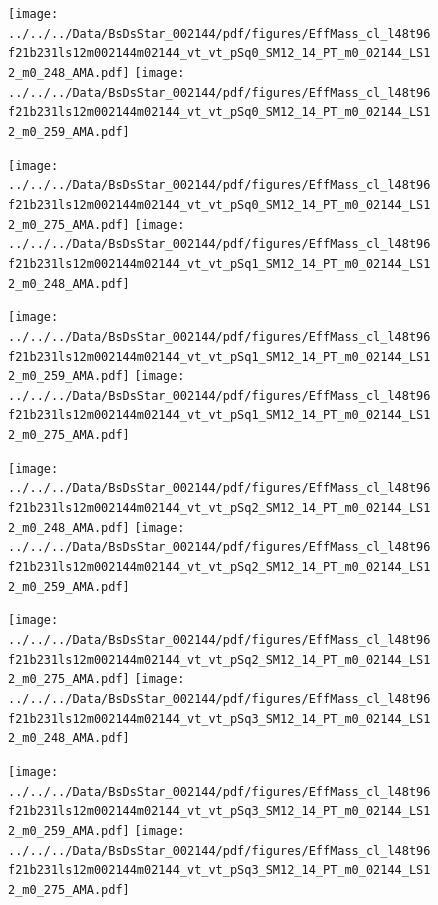 \documentclass[a4paper,10pt]{article}
\begin{document}
\begin{figure}[p]
 \texttt{[image: ../../../Data/BsDsStar\_002144/pdf/figures/EffMass\_cl\_l48t96f21b231ls12m002144m02144\_vt\_vt\_pSq0\_SM12\_14\_PT\_m0\_02144\_LS12\_m0\_248\_AMA.pdf]} 
 \texttt{[image: ../../../Data/BsDsStar\_002144/pdf/figures/EffMass\_cl\_l48t96f21b231ls12m002144m02144\_vt\_vt\_pSq0\_SM12\_14\_PT\_m0\_02144\_LS12\_m0\_259\_AMA.pdf]} 
 \end{figure}
\begin{figure}[p]
 \texttt{[image: ../../../Data/BsDsStar\_002144/pdf/figures/EffMass\_cl\_l48t96f21b231ls12m002144m02144\_vt\_vt\_pSq0\_SM12\_14\_PT\_m0\_02144\_LS12\_m0\_275\_AMA.pdf]} 
 \texttt{[image: ../../../Data/BsDsStar\_002144/pdf/figures/EffMass\_cl\_l48t96f21b231ls12m002144m02144\_vt\_vt\_pSq1\_SM12\_14\_PT\_m0\_02144\_LS12\_m0\_248\_AMA.pdf]} 
 \end{figure}
\begin{figure}[p]
 \texttt{[image: ../../../Data/BsDsStar\_002144/pdf/figures/EffMass\_cl\_l48t96f21b231ls12m002144m02144\_vt\_vt\_pSq1\_SM12\_14\_PT\_m0\_02144\_LS12\_m0\_259\_AMA.pdf]} 
 \texttt{[image: ../../../Data/BsDsStar\_002144/pdf/figures/EffMass\_cl\_l48t96f21b231ls12m002144m02144\_vt\_vt\_pSq1\_SM12\_14\_PT\_m0\_02144\_LS12\_m0\_275\_AMA.pdf]} 
 \end{figure}
\clearpage
\begin{figure}[p]
 \texttt{[image: ../../../Data/BsDsStar\_002144/pdf/figures/EffMass\_cl\_l48t96f21b231ls12m002144m02144\_vt\_vt\_pSq2\_SM12\_14\_PT\_m0\_02144\_LS12\_m0\_248\_AMA.pdf]} 
 \texttt{[image: ../../../Data/BsDsStar\_002144/pdf/figures/EffMass\_cl\_l48t96f21b231ls12m002144m02144\_vt\_vt\_pSq2\_SM12\_14\_PT\_m0\_02144\_LS12\_m0\_259\_AMA.pdf]} 
 \end{figure}
\begin{figure}[p]
 \texttt{[image: ../../../Data/BsDsStar\_002144/pdf/figures/EffMass\_cl\_l48t96f21b231ls12m002144m02144\_vt\_vt\_pSq2\_SM12\_14\_PT\_m0\_02144\_LS12\_m0\_275\_AMA.pdf]} 
 \texttt{[image: ../../../Data/BsDsStar\_002144/pdf/figures/EffMass\_cl\_l48t96f21b231ls12m002144m02144\_vt\_vt\_pSq3\_SM12\_14\_PT\_m0\_02144\_LS12\_m0\_248\_AMA.pdf]} 
 \end{figure}
\begin{figure}[p]
 \texttt{[image: ../../../Data/BsDsStar\_002144/pdf/figures/EffMass\_cl\_l48t96f21b231ls12m002144m02144\_vt\_vt\_pSq3\_SM12\_14\_PT\_m0\_02144\_LS12\_m0\_259\_AMA.pdf]} 
 \texttt{[image: ../../../Data/BsDsStar\_002144/pdf/figures/EffMass\_cl\_l48t96f21b231ls12m002144m02144\_vt\_vt\_pSq3\_SM12\_14\_PT\_m0\_02144\_LS12\_m0\_275\_AMA.pdf]} 
 \end{figure}
\end{document}
